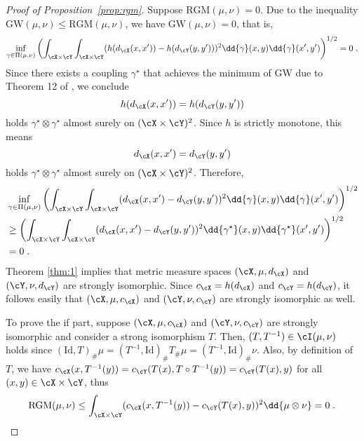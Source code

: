 \documentclass[11pt]{article}
\begin{document}
\begin{proof}[Proof of Proposition~\ref{prop:rgm}]
	Suppose $\mathrm{RGM}(\mu, \nu) = 0$. Due to the inequality $\mathrm{GW}(\mu, \nu) \le \mathrm{RGM}(\mu, \nu)$, we have $\mathrm{GW}(\mu, \nu) = 0$, that is, 
	\begin{equation*}
		\inf_{\gamma \in \Pi(\mu, \nu)} \left( \int_{\cX \times \cY} \int_{\cX \times \cY} (h(d_{\cX}(x, x')) - h(d_{\cY}(y, y')))^2 \dd{\gamma}(x, y) \dd{\gamma}(x', y') \right)^{1/2} = 0 \;.
	\end{equation*}
	Since there exists a coupling $\gamma^\star$ that achieves the minimum of GW due to Theorem 12 of \cite{chowdhury_memoli_2019}, we conclude
	\begin{equation*}
		h(d_{\cX}(x, x')) = h(d_{\cY}(y, y'))
	\end{equation*}
	holds $\gamma^\star \otimes \gamma^\star$ almost surely on $(\cX \times \cY)^2$. Since $h$ is strictly monotone, this means
	\begin{equation*}
		d_{\cX}(x, x') = d_{\cY}(y, y')
	\end{equation*}
	holds $\gamma^\star \otimes \gamma^\star$ almost surely on $(\cX \times \cY)^2$. Therefore, 
	\begin{equation*}
		\begin{split}
			& \inf_{\gamma \in \Pi(\mu, \nu)} \left( \int_{\cX \times \cY} \int_{\cX \times \cY} (d_{\cX}(x, x') - d_{\cY}(y, y'))^2 \dd{\gamma}(x, y) \dd{\gamma}(x', y') \right)^{1/2} \\
			& \ge \left( \int_{\cX \times \cY} \int_{\cX \times \cY} (d_{\cX}(x, x') - d_{\cY}(y, y'))^2 \dd{\gamma^\star}(x, y) \dd{\gamma^\star}(x', y') \right)^{1/2} \\
			& = 0 \;.
		\end{split}
	\end{equation*}
	Theorem \ref{thm:1} implies that metric measure spaces $(\cX, \mu, d_{\cX})$ and $(\cY, \nu, d_{\cY})$ are strongly isomorphic. Since $c_{\cX} = h(d_{\cX})$ and $c_{\cY} = h(d_{\cY})$, it follows easily that $(\cX, \mu, c_{\cX})$ and $(\cY, \nu, c_{\cY})$ are strongly isomorphic as well.

	To prove the if part, suppose $(\cX, \mu, c_{\cX})$ and $(\cY, \nu, c_{\cY})$ are strongly isomorphic and consider a strong isomorphism $T$. Then, $(T, T^{-1}) \in \cI(\mu, \nu)$ holds since $(\mathrm{Id}, T)_{\#} \mu = (T^{-1}, \mathrm{Id})_{\#} T_{\#} \mu = (T^{-1}, \mathrm{Id})_{\#} \nu$. Also, by definition of $T$, we have $c_{\cX}(x, T^{-1}(y)) = c_{\cY}(T(x), T \circ T^{-1}(y)) = c_{\cY}(T(x), y)$ for all $(x, y) \in \cX \times \cY$, thus
	\begin{equation*}
		\mathrm{RGM}(\mu, \nu) \le \int_{\cX \times \cY} (c_{\cX}(x, T^{-1}(y)) -  c_{\cY}(T(x), y))^2 \dd{\mu \otimes \nu} = 0\;.
	\end{equation*}
\end{proof}
\end{document}
